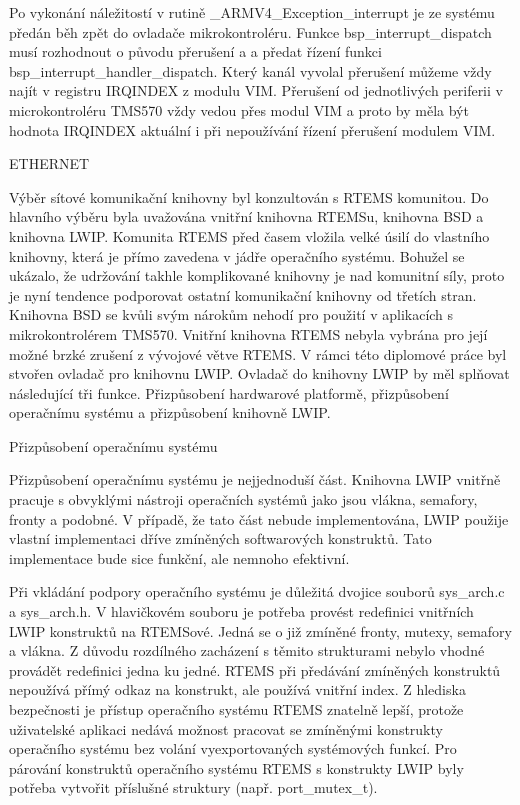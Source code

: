 Po vykonání náležitostí v rutině \_ARMV4\_Exception\_interrupt je ze systému předán běh zpět do ovladače mikrokontroléru.
Funkce bsp\_interrupt\_dispatch musí rozhodnout o původu přerušení a a předat řízení funkci bsp\_interrupt\_handler\_dispatch.
Který kanál vyvolal přerušení můžeme vždy najít v registru IRQINDEX z modulu VIM.
Přerušení od jednotlivých periferii v microkontroléru TMS570 vždy vedou přes modul VIM a proto by měla být hodnota IRQINDEX aktuální i při nepoužívání řízení přerušení modulem VIM.

\sec ETHERNET

	Výběr sítové komunikační knihovny byl konzultován s RTEMS komunitou.
Do hlavního výběru byla uvažována vnitřní knihovna RTEMSu, knihovna BSD a knihovna LWIP.
Komunita RTEMS před časem vložila velké úsilí do vlastního knihovny, která je přímo zavedena v jádře operačního systému.
Bohužel se ukázalo, že udržování takhle komplikované knihovny je nad komunitní síly, proto je nyní tendence podporovat ostatní komunikační knihovny od třetích stran.
Knihovna BSD se kvůli svým nárokům nehodí pro použití v aplikacích s mikrokontrolérem TMS570.
Vnitřní knihovna RTEMS nebyla vybrána pro její možné brzké zrušení z vývojové větve RTEMS.
V rámci této diplomové práce byl stvořen ovladač pro knihovnu LWIP.
Ovladač do knihovny LWIP by měl splňovat následující tři funkce.
Přizpůsobení hardwarové platformě, přizpůsobení operačnímu systému a přizpůsobení knihovně LWIP. 

\secc Přizpůsobení operačnímu systému

Přizpůsobení operačnímu systému je nejjednoduší část.
Knihovna LWIP vnitřně pracuje s obvyklými nástroji operačních systémů jako jsou vlákna, semafory, fronty a podobné.
V případě, že tato část nebude implementována, LWIP použije vlastní implementaci dříve zmíněných softwarových konstruktů.
Tato implementace bude sice funkční, ale nemnoho efektivní.

Při vkládání podpory operačního systému je důležitá dvojice souborů sys\_arch.c a sys\_arch.h.
V hlavičkovém souboru je potřeba provést redefinici vnitřních LWIP konstruktů na RTEMSové.
Jedná se o již zmíněné fronty, mutexy, semafory a vlákna.
Z důvodu rozdílného zacházení s těmito strukturami nebylo vhodné provádět redefinici jedna ku jedné.
RTEMS při předávání zmíněných konstruktů nepoužívá přímý odkaz na konstrukt, ale používá vnitřní index.
Z hlediska bezpečnosti je přístup operačního systému RTEMS znatelně lepší, protože uživatelské aplikaci nedává možnost pracovat se zmíněnými konstrukty operačního systému bez volání vyexportovaných systémových funkcí.
Pro párování konstruktů operačního systému RTEMS s konstrukty LWIP byly potřeba vytvořit příslušné struktury (např. port\_mutex\_t).

